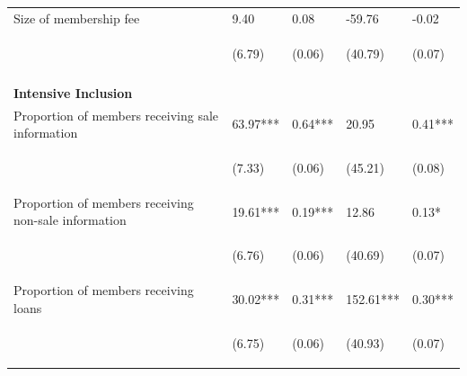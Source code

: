 \documentclass[11pt]{article}
\begin{document}
\begin{table}[H]
{\begin{tabularx}{1.5\linewidth}{lllll}
\noalign{\smallskip}Size of membership fee & 9.40 & 0.08 & -59.76 & -0.02\\
 & \begin{footnotesize}(6.79)\end{footnotesize} & \begin{footnotesize}(0.06)\end{footnotesize} & \begin{footnotesize}(40.79)\end{footnotesize} & \begin{footnotesize}(0.07)\end{footnotesize}\\ \\

\textbf{Intensive Inclusion} & & & & \\
\noalign{\smallskip}Proportion of members receiving sale information & 63.97*** & 0.64*** & 20.95 & 0.41***\\
 & \begin{footnotesize}(7.33)\end{footnotesize} & \begin{footnotesize}(0.06)\end{footnotesize} & \begin{footnotesize}(45.21)\end{footnotesize} & \begin{footnotesize}(0.08)\end{footnotesize}\\
\noalign{\smallskip}Proportion of members receiving non-sale information & 19.61*** & 0.19*** & 12.86 & 0.13*\\
 & \begin{footnotesize}(6.76)\end{footnotesize} & \begin{footnotesize}(0.06)\end{footnotesize} & \begin{footnotesize}(40.69)\end{footnotesize} & \begin{footnotesize}(0.07)\end{footnotesize}\\
\noalign{\smallskip}Proportion of members receiving loans & 30.02*** & 0.31*** & 152.61*** & 0.30***\\
 & \begin{footnotesize}(6.75)\end{footnotesize} & \begin{footnotesize}(0.06)\end{footnotesize} & \begin{footnotesize}(40.93)\end{footnotesize} & \begin{footnotesize}(0.07)\end{footnotesize}\\

\end{tabularx}}
\end{table}
\end{document}
